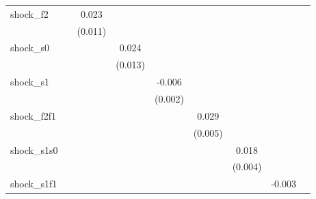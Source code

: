{\begin{tabular}{l*{8}{c}}
\addlinespace
shock\_f2    &                     &       0.023\sym{*}  &                     &                     &                     &                     &                     &                     \\
            &                     &     (0.011)         &                     &                     &                     &                     &                     &                     \\
\addlinespace
shock\_s0    &                     &                     &       0.024\sym{*}  &                     &                     &                     &                     &                     \\
            &                     &                     &     (0.013)         &                     &                     &                     &                     &                     \\
\addlinespace
shock\_s1    &                     &                     &                     &      -0.006\sym{**} &                     &                     &                     &                     \\
            &                     &                     &                     &     (0.002)         &                     &                     &                     &                     \\
\addlinespace
shock\_f2f1  &                     &                     &                     &                     &       0.029\sym{***}&                     &                     &                     \\
            &                     &                     &                     &                     &     (0.005)         &                     &                     &                     \\
\addlinespace
shock\_s1s0  &                     &                     &                     &                     &                     &       0.018\sym{***}&                     &                     \\
            &                     &                     &                     &                     &                     &     (0.004)         &                     &                     \\
\addlinespace
shock\_s1f1  &                     &                     &                     &                     &                     &                     &      -0.003         &                     \\

\end{tabular}}
